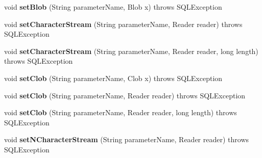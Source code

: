 \begin{DoxyCompactItemize}
void {\bfseries set\+Blob} (String parameter\+Name, Blob x)  throws S\+Q\+L\+Exception 
\item 
\mbox{\label{classcom_1_1mysql_1_1jdbc_1_1jdbc2_1_1optional_1_1_j_d_b_c4_callable_statement_wrapper_ab6114dd99bbd521695eb5d03879aec3b}} 
void {\bfseries set\+Character\+Stream} (String parameter\+Name, Reader reader)  throws S\+Q\+L\+Exception 
\item 
\mbox{\label{classcom_1_1mysql_1_1jdbc_1_1jdbc2_1_1optional_1_1_j_d_b_c4_callable_statement_wrapper_a441c3b2a518e2a25f6a204facbe981eb}} 
void {\bfseries set\+Character\+Stream} (String parameter\+Name, Reader reader, long length)  throws S\+Q\+L\+Exception 
\item 
\mbox{\label{classcom_1_1mysql_1_1jdbc_1_1jdbc2_1_1optional_1_1_j_d_b_c4_callable_statement_wrapper_a292952faaf663f1faf9d2c04d3ee3b81}} 
void {\bfseries set\+Clob} (String parameter\+Name, Clob x)  throws S\+Q\+L\+Exception 
\item 
\mbox{\label{classcom_1_1mysql_1_1jdbc_1_1jdbc2_1_1optional_1_1_j_d_b_c4_callable_statement_wrapper_a83b46f71703504ba02a8a33862cd87e4}} 
void {\bfseries set\+Clob} (String parameter\+Name, Reader reader)  throws S\+Q\+L\+Exception 
\item 
\mbox{\label{classcom_1_1mysql_1_1jdbc_1_1jdbc2_1_1optional_1_1_j_d_b_c4_callable_statement_wrapper_a899ac6f3df9d56f46a7c38d23da7ef64}} 
void {\bfseries set\+Clob} (String parameter\+Name, Reader reader, long length)  throws S\+Q\+L\+Exception 
\item 
\mbox{\label{classcom_1_1mysql_1_1jdbc_1_1jdbc2_1_1optional_1_1_j_d_b_c4_callable_statement_wrapper_a764089981b180d7895c5d3f439d53682}} 
void {\bfseries set\+N\+Character\+Stream} (String parameter\+Name, Reader reader)  throws S\+Q\+L\+Exception 

\end{DoxyCompactItemize}
